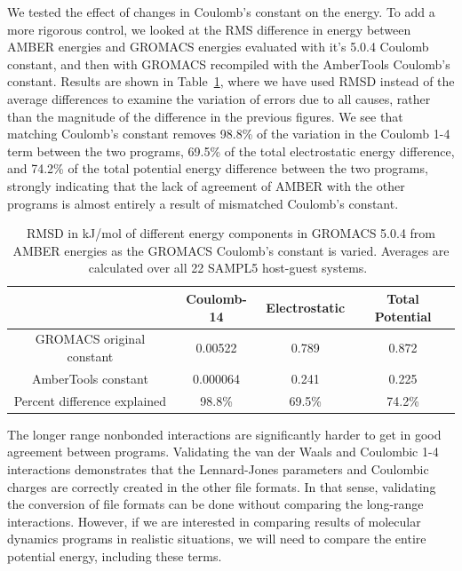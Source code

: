 We tested the effect of changes in Coulomb's constant on the energy.
To add a more rigorous control, we looked at the RMS difference in
energy between AMBER energies and GROMACS energies evaluated with it's
5.0.4 Coulomb constant, and then with GROMACS recompiled with the
AmberTools Coulomb's constant.  Results are shown in
Table~\ref{table:coulchange}, where we have used RMSD instead of the
average differences to examine the variation of errors due to all causes,
rather than the magnitude of the difference in the previous figures.
 We see that matching Coulomb's constant
removes 98.8\% of the variation in the Coulomb 1-4 term between the
two programs, 69.5\% of the total electrostatic energy difference, and
74.2\% of the total potential energy difference between the two
programs, strongly indicating that the lack of agreement of AMBER with
the other programs is almost entirely a result of mismatched Coulomb's constant.

\begin{table}
\caption{RMSD in kJ/mol of different energy components in GROMACS
  5.0.4 from AMBER energies as the GROMACS Coulomb's constant is
  varied. Averages are calculated over all 22 SAMPL5 host-guest
  systems.~\label{table:coulchange}}
\begin{center}
\begin{tabular}{|c|ccc|}
\hline
                          & Coulomb-14  & Electrostatic & Total Potential \\
\hline
GROMACS original constant &  0.00522    & 0.789         & 0.872  \\ 
AmberTools constant      &  0.000064   & 0.241         & 0.225 \\
Percent difference explained & 98.8\%   & 69.5\%        & 74.2\% \\  
\hline
\end{tabular}
\end{center}
\end{table}

The longer range nonbonded interactions are significantly harder to
get in good agreement between programs.  Validating the van der Waals
and Coulombic 1-4 interactions demonstrates that the Lennard-Jones
parameters and Coulombic charges are correctly created in the other
file formats.  In that sense, validating the conversion of file
formats can be done without comparing the long-range
interactions. However, if we are interested in comparing results of
molecular dynamics programs in realistic situations, we will need to
compare the entire potential energy, including these terms. 

